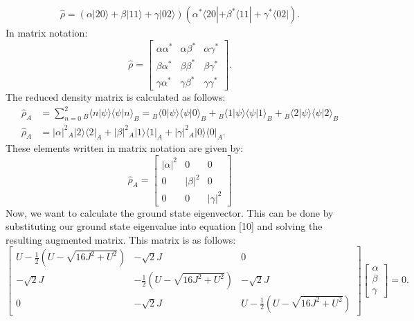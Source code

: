 \begin{align}
\hat{\rho} = \left( \alpha |2 0 \rangle + \beta |1 1 \rangle + \gamma |0 2 \rangle \right) \left( \alpha^* \langle 2 0 | + \beta^* \langle 1 1| + \gamma^* \langle 0 2| \right).
\end{align}
\noindent In matrix notation:
\begin{equation}
\hat{\rho} = \begin{bmatrix} \alpha \alpha^* & \alpha \beta^* & \alpha \gamma^* \\ \beta \alpha^* & \beta \beta^* & \beta \gamma^* \\ \gamma \alpha^* & \gamma \beta^* & \gamma \gamma^* \end{bmatrix}.
\end{equation}
\noindent The reduced density matrix is calculated as follows:
\begin{align}
\hat{\rho}_A &= \sum_{n=0}^{2}{{}_B \langle n | \psi \rangle \langle \psi | n \rangle_B} = {}_B \langle 0 | \psi \rangle \langle \psi | 0 \rangle_B + {}_B \langle 1 | \psi \rangle \langle \psi | 1 \rangle_B + {}_B \langle 2 | \psi \rangle \langle \psi | 2 \rangle_B \\
\hat{\rho}_A &=|\alpha|^2 {}_A |2\rangle\langle2|_A + |\beta|^2 {}_A |1\rangle\langle1|_A + |\gamma|^2 {}_A |0\rangle\langle0|_A.
\end{align}
\noindent These elements written in matrix notation are given by:
\begin{equation}
\hat{\rho}_A = \begin{bmatrix} |\alpha|^2 & 0 & 0 \\ 0 & |\beta|^2 & 0 \\ 0 & 0 & |\gamma|^2 \end{bmatrix}
\end{equation}
\noindent Now, we want to calculate the ground state eigenvector. This can be done by substituting our ground state eigenvalue into equation [10] and solving the resulting augmented matrix. This matrix is as follows:
\begin{equation}
\begin{bmatrix} U - \frac{1}{2} \left( U - \sqrt{16J^2 + U^2} \right) & -\sqrt{2}J & 0 \\ -\sqrt{2}J & -\frac{1}{2} \left( U - \sqrt{16J^2 + U^2} \right) & -\sqrt{2}J \\ 0 & -\sqrt{2}J & U - \frac{1}{2} \left( U - \sqrt{16J^2 + U^2} \right) \end{bmatrix} \begin{bmatrix} \alpha \\ \beta \\ \gamma \end{bmatrix} = 0.
\end{equation}
